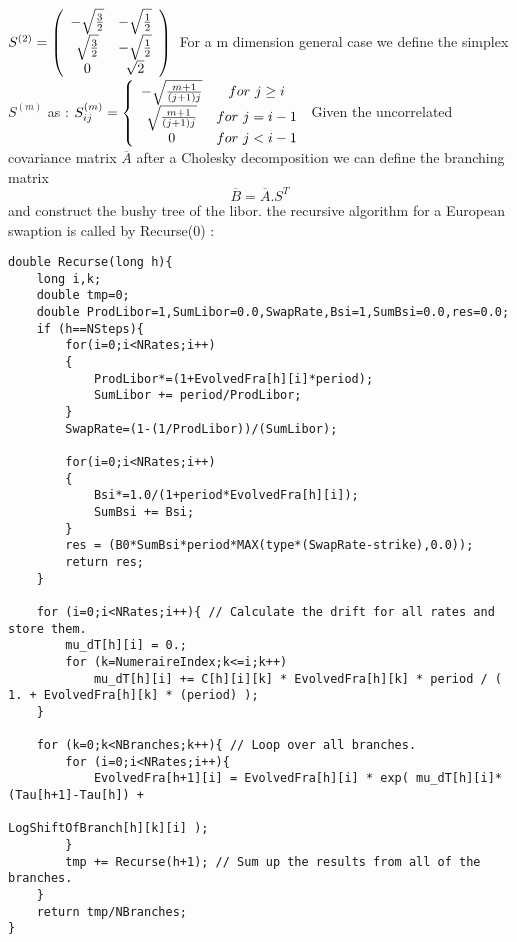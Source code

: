 \begin{math}
S^{(2)} = \left(
\begin{array}{c c}
			-\sqrt{\frac{3}{2}} & -\sqrt{\frac{1}{2}} \\
      \sqrt{\frac{3}{2}} & -\sqrt{\frac{1}{2}} \\
      0 & \sqrt{2} \\ 
\end{array}
\right)\\
\end{math}
For a m dimension general case we define the simplex $S^{(m)}$ as :
\begin{math}
S^{(m)}_{ij} = \left\{
\begin{array}{c c}
			-\sqrt{\frac{m+1}{(j+1)j}} & for\  j\geq i \\
			\sqrt{\frac{m+1}{(j+1)j}} & for\  j= i-1 \\
			0 & for\  j< i-1
\end{array}
\right.
\end{math}
Given the uncorrelated covariance matrix $\overline{A}$ after a Cholesky decomposition we can define the branching matrix
$$\overline{B}=\overline{A}.S^{T}$$
and construct the bushy tree of the libor.
the recursive algorithm for a European swaption is called by Recurse(0) :
\small{
\begin{verbatim}
double Recurse(long h){
	long i,k;
	double tmp=0;
	double ProdLibor=1,SumLibor=0.0,SwapRate,Bsi=1,SumBsi=0.0,res=0.0;
	if (h==NSteps){
		for(i=0;i<NRates;i++)
		{
			ProdLibor*=(1+EvolvedFra[h][i]*period);
			SumLibor += period/ProdLibor;
		}
		SwapRate=(1-(1/ProdLibor))/(SumLibor);
		
		for(i=0;i<NRates;i++)
		{
			Bsi*=1.0/(1+period*EvolvedFra[h][i]);
			SumBsi += Bsi;
		}
		res = (B0*SumBsi*period*MAX(type*(SwapRate-strike),0.0));
		return res;
	}
	
	for (i=0;i<NRates;i++){ // Calculate the drift for all rates and store them.
		mu_dT[h][i] = 0.;
		for (k=NumeraireIndex;k<=i;k++)
			mu_dT[h][i] += C[h][i][k] * EvolvedFra[h][k] * period / ( 1. + EvolvedFra[h][k] * (period) );
	}
	
	for (k=0;k<NBranches;k++){ // Loop over all branches.
		for (i=0;i<NRates;i++){
			EvolvedFra[h+1][i] = EvolvedFra[h][i] * exp( mu_dT[h][i]*(Tau[h+1]-Tau[h]) +
																											 LogShiftOfBranch[h][k][i] );
		}
		tmp += Recurse(h+1); // Sum up the results from all of the branches.
	}
	return tmp/NBranches;
}

\end{verbatim}
}
